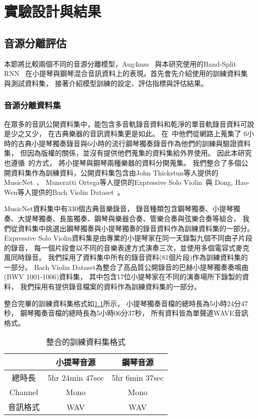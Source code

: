 \documentclass[class=NCU_thesis, crop=false]{standalone}
\begin{document}
\chapter{實驗設計與結果}

\section{音源分離評估}
本節將比較兩個不同的音源分離模型，Aug4mss~\cite{Chiu_ChingYu2020MixingSpecific}
與本研究使用的Band-Split RNN~\cite{Luo_Yi2022MusicSourceSeparation}
在小提琴與鋼琴混合音訊資料上的表現。首先會先介紹使用的訓練資料集與測試資料集，
接著介紹模型訓練的設定、評估指標與評估結果。

\subsection{音源分離資料集}
在眾多的音訊公開資料集中，能包含多音軌錄音資料和乾淨的單音軌錄音資料可說是少之又少，
在古典樂器的音訊資料集更是如此。
在~\cite{Chiu_ChingYu2020MixingSpecific}中他們從網路上蒐集了
6小時的古典小提琴獨奏錄音與6小時的流行鋼琴獨奏錄音作為他們的訓練與驗證資料集，
但因為版權的關係，並沒有提供他們蒐集的資料集給外界使用。
因此本研究也遵循~\cite{Chiu_ChingYu2020MixingSpecific}的方式，
將小提琴與鋼琴兩種樂器的資料分開蒐集。
我們整合了多個公開資料集作為訓練資料，公開資料集包含由John Thickstun等人提供的
MusicNet~\cite{Thickstun2017Learning, Thickstun2018Invariances}、
Muneratti Ortega等人提供的Expressive Solo Violin~\cite{Muneratti_Ortega2021Expressive}與
Dong, Hao-Wen等人提供的Bach Violin Dataset~\cite{Dong_HaoWen2021Bach}。

MusicNet資料集中有330個古典音樂錄音，
錄音種類包含鋼琴獨奏、小提琴獨奏、大提琴獨奏、長笛獨奏、鋼琴與樂器合奏、管樂合奏與弦樂合奏等組合，
我們從資料集中挑選出鋼琴獨奏與小提琴獨奏的錄音資料作為訓練資料集的一部分。
Expressive Solo Violin資料集是由專業的小提琴家在同一天錄製九個不同曲子片段的錄音，
每一個片段會以不同的音樂表達方式演奏三次，並使用多個電容式麥克風同時錄音。
我們採用了資料集中所有的錄音資料(81個片段)作為訓練資料集的一部分。
Bach Violin Dataset為整合了高品質公開錄音的巴赫小提琴獨奏奏鳴曲(BWV 1001-1006)資料集，
其中包含17位小提琴家在不同的演奏場所下錄製的資料，
我們採用有提供錄音檔案的資料作為訓練資料集的一部分。

整合完畢的訓練資料集格式如\cref{table:table-ours-training-dataset}所示，
小提琴獨奏音檔的總時長為5小時24分47秒，
鋼琴獨奏音檔的總時長為5小時06分37秒，
所有資料皆為單聲道WAVE音訊格式。
\begin{table}[h]
    \centering
    \caption{整合的訓練資料集格式}
    \label{table:table-ours-training-dataset}
    \begin{tabular}{|c|c|c|}
        \hline
        \multicolumn{1}{|c|}{} & \multicolumn{1}{|c|}{小提琴音源} & \multicolumn{1}{|c|}{鋼琴音源} \\
        \hline
        總時長 & 5hr 24min 47sec & 5hr 6min 37sec \\
        \hline
        Channel & Mono & Mono \\
        \hline
        音訊格式 & WAV & WAV \\
        \hline
    \end{tabular}
\end{table}
\end{document}
